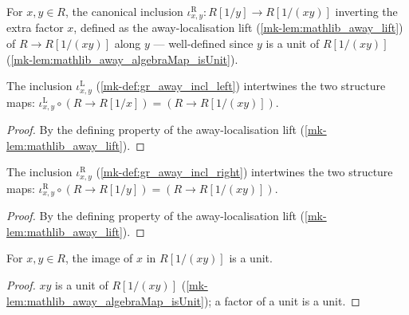 \begin{definition}\label{mk-def:gr_away_incl_right}
  \leanok

  For \(x, y \in R\), the canonical inclusion
  \(\iota^{\mathrm{R}}_{x,y} : R[1/y] \to R[1/(xy)]\) inverting the extra factor
  \(x\), defined as the away-localisation lift (\ref{mk-lem:mathlib_away_lift}) of
  \(R \to R[1/(xy)]\) along \(y\) — well-defined since \(y\) is a unit of
  \(R[1/(xy)]\) (\ref{mk-lem:mathlib_away_algebraMap_isUnit}).
\end{definition}

\begin{lemma}\label{mk-lem:gr_awayInclLeft_comp_algebraMap}
  \leanok

  The inclusion \(\iota^{\mathrm{L}}_{x,y}\) (\ref{mk-def:gr_away_incl_left})
  intertwines the two structure maps:
  \(\iota^{\mathrm{L}}_{x,y} \circ (R \to R[1/x]) = (R \to R[1/(xy)])\).
\end{lemma}
\begin{proof}
  \leanok

By the defining property of the away-localisation lift
  (\ref{mk-lem:mathlib_away_lift}).
\end{proof}

\begin{lemma}\label{mk-lem:gr_awayInclRight_comp_algebraMap}
  \leanok

  The inclusion \(\iota^{\mathrm{R}}_{x,y}\) (\ref{mk-def:gr_away_incl_right})
  intertwines the two structure maps:
  \(\iota^{\mathrm{R}}_{x,y} \circ (R \to R[1/y]) = (R \to R[1/(xy)])\).
\end{lemma}
\begin{proof}
  \leanok

By the defining property of the away-localisation lift
  (\ref{mk-lem:mathlib_away_lift}).
\end{proof}

\begin{lemma}\label{mk-lem:gr_isUnit_algebraMap_away_left}
  \leanok

  For \(x, y \in R\), the image of \(x\) in \(R[1/(xy)]\) is a unit.
\end{lemma}
\begin{proof}
  \leanok

\(xy\) is a unit of \(R[1/(xy)]\)
  (\ref{mk-lem:mathlib_away_algebraMap_isUnit}); a factor of a unit is a unit.

\end{proof}

